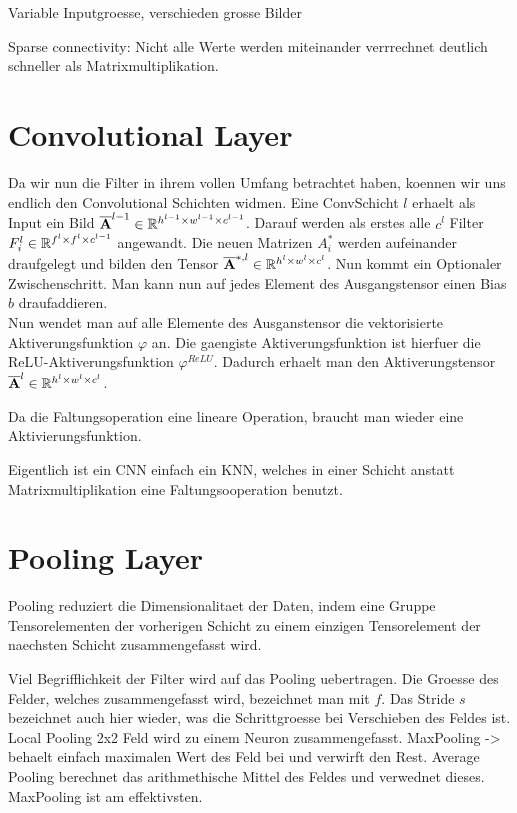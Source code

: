 Variable Inputgroesse, verschieden grosse Bilder

Sparse connectivity: Nicht alle Werte werden miteinander verrrechnet deutlich
schneller als Matrixmultiplikation.

\section{Convolutional Layer}
Da wir nun die Filter in ihrem vollen Umfang betrachtet haben, koennen wir uns
endlich den Convolutional Schichten widmen.
Eine ConvSchicht $l$ erhaelt als Input ein Bild $\overline{\mathbf{A}}^{l-1} \in \mathbb{R}^{h^{l-1}
  \times w^{l-1} \times c^{l-1}}$. Darauf werden
als erstes alle $c^l$ Filter $F_i^l \in \mathbb{R}^{f^l \times f^l \times c^{l-1}}$ angewandt. Die neuen Matrizen $A^*_i$
werden aufeinander draufgelegt und bilden den Tensor $\overline{\mathbf{A}}^{*,l} \in \mathbb{R}^{h^l
  \times w^l \times c^l}$.
Nun kommt ein Optionaler Zwischenschritt. Man kann nun auf jedes Element des
Ausgangstensor einen Bias $b$ draufaddieren. \\
Nun wendet man auf alle Elemente des Ausganstensor die vektorisierte
Aktiverungsfunktion $\varphi$ an. Die gaengiste Aktiverungsfunktion ist hierfuer
die ReLU-Aktiverungsfunktion $\varphi^{ReLU}$. Dadurch erhaelt man den
Aktiverungstensor $\overline{\mathbf{A}}^l \in \mathbb{R}^{h^l \times w^l \times c^l}$.




Da die Faltungsoperation eine lineare Operation, braucht man wieder eine Aktivierungsfunktion.

Eigentlich ist ein CNN einfach ein KNN, welches in einer Schicht anstatt
Matrixmultiplikation eine Faltungsooperation benutzt.

\cite{Goodfellow-et-al-2016}

\section{Pooling Layer}
Pooling reduziert die Dimensionalitaet der Daten, indem eine Gruppe Tensorelementen
der vorherigen Schicht zu einem einzigen Tensorelement der naechsten Schicht
zusammengefasst wird.

Viel Begrifflichkeit der Filter wird auf das Pooling uebertragen. Die Groesse
des Felder, welches zusammengefasst wird, bezeichnet man mit $f$. Das Stride $s$
bezeichnet auch hier wieder, was die Schrittgroesse bei Verschieben des Feldes ist.
Local Pooling 2x2 Feld wird zu einem Neuron zusammengefasst. MaxPooling ->
behaelt einfach maximalen Wert des Feld bei und verwirft den Rest. Average
Pooling berechnet das arithmethische Mittel des Feldes und verwednet dieses.
MaxPooling ist am effektivsten.

